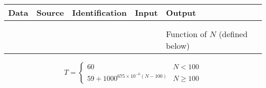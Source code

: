 \begin{table}[htp]
\centering
\begin{tabular}{
|
>{\centering\arraybackslash}p{2.5cm}|
>{\centering\arraybackslash}p{2.25cm}|
>{\centering\arraybackslash}p{2.5cm}|
>{\centering\arraybackslash}p{2.25cm}|
>{\centering\arraybackslash}p{2.25cm}|}
\hline

\textbf{Data}
& 
\textbf{Source}
&
\textbf{Identification}
&
\textbf{Input}
& 
\textbf{Output} \\ \hline
 &  &  &  & 
\\ \hline
 &  &  &  & 
\\ \hline
 &  & & & Function of $N$ (defined below)
\\ \hline
\end{tabular}

\[
T=\begin{cases} 60 & N < 100 \\
59 + 1000^{675\times10^{-6} (N-100)} & N \geq 100
\end{cases}
\]

\end{table}
